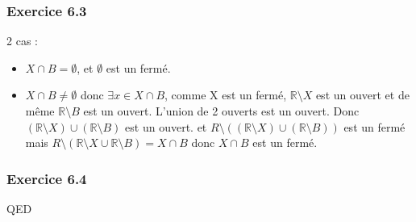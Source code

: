 \documentclass[]{book}
\theoremstyle{definition}
\newcommand{\bb}[1]{\mathbb{#1}}
\newcommand{\R}{\bb{R}}
\begin{document}
\subsubsection*{Exercice 6.3}
2 cas :
\begin{itemize}
\item $X \cap B = \emptyset$, et $\emptyset$ est un ferm\'e.
\item $X \cap B \neq \emptyset$ donc $\exists x \in X \cap B$, comme X est un ferm\'e, $\R \setminus X$ est un ouvert et de m\^eme $\R \setminus B$ est un ouvert. 
L'union de 2 ouverts est un ouvert. Donc $(\R \setminus X) \cup (\R \setminus B)$ est un ouvert. et $R \setminus ((\R \setminus X) \cup (\R \setminus B))$ est un ferm\'e mais $R \setminus (\R \setminus X \cup \R \setminus B)  = X \cap B$ donc $X \cap B$ est un ferm\'e.
\end{itemize}

\subsubsection*{Exercice 6.4}


QED
\end{document}
